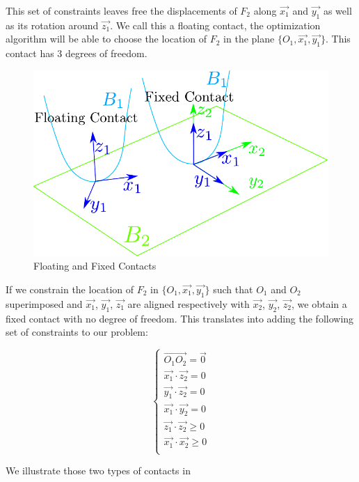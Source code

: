 This set of constraints leaves free the displacements of $F_2$ along $\vec{x_1}$ and $\vec{y_1}$ as well as its rotation around $\vec{z_1}$.
We call this a floating contact, the optimization algorithm will be able to choose the location of $F_2$ in the plane $\{O_1, \vec{x_1}, \vec{y_1}\}$. This contact has 3 degrees of freedom.

\begin{figure}[htpb]
  \centering
  \includegraphics[width=0.8\linewidth]{contactConstraint.pdf}
  \caption{Floating and Fixed Contacts}
\label{fig:contactConstraint}
\end{figure}

If we constrain the location of $F_2$ in $\{O_1, \vec{x_1}, \vec{y_1}\}$ such that $O_1$ and $O_2$ superimposed and $\vec{x_1}$, $\vec{y_1}$, $\vec{z_1}$ are aligned respectively with $\vec{x_2}$, $\vec{y_2}$, $\vec{z_2}$, we obtain a fixed contact with no degree of freedom. This translates into adding the following set of constraints to our problem:

\begin{equation}
\label{eq:fixed_contact}
\boxed{\left\{
  \begin{array}{l}
    \overrightarrow{O_1O_2} = \vec{0}\\
    \vec{x_1}\cdot\vec{z_2} = 0\\
    \vec{y_1}\cdot\vec{z_2} = 0\\
    \vec{x_1}\cdot\vec{y_2} = 0\\
    \vec{z_1}\cdot\vec{z_2} \geq 0\\
    \vec{x_1}\cdot\vec{x_2} \geq 0\\
  \end{array}
  \right.}
\end{equation}

We illustrate those two types of contacts in~


